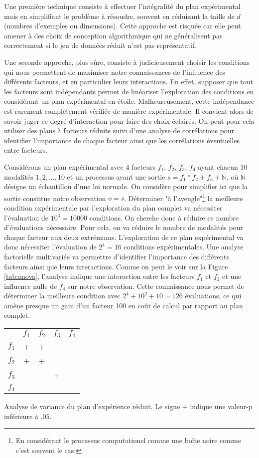 Une première technique consiste à effectuer l'intégralité du plan expérimental mais en simplifiant le problème à résoudre, souvent en réduisant la taille de $d$ (nombres d'exemples ou dimensions). Cette approche est risquée car elle peut amener à des choix de conception algorithmique qui ne généralisent pas correctement si le jeu de données réduit n'est pas représentatif.

Une seconde approche, plus sûre, consiste à judicieusement choisir les conditions qui nous permettent de maximiser notre connaissances de l'influence des différents facteurs, et en particulier leurs interactions. En effet, supposer que tout les facteurs sont indépendants permet de linéariser l'exploration des conditions en considérant un plan expérimental en étoile. Malheureusement, cette indépendance est rarement complètement vérifiée de manière expérimentale. Il convient alors de savoir juger ce degré d'interaction pour faire des choix éclairés. On peut pour cela utiliser des plans à facteurs réduits suivi d'une analyse de corrélations pour identifier l'importance de chaque facteur ainsi que les corrélations éventuelles entre facteurs.

Considérons un plan expérimental avec 4 facteurs $f_1$, $f_2$, $f_3$, $f_4$ ayant chacun 10 modalités ${1, 2, ..., 10}$ et un processus ayant une sortie $s=f_1*f_2+f_3+\mathbb{N}$, où $\mathbb{N}$ désigne un échantillon d'une loi normale. On considère pour simplifier ici que la sortie constitue notre observation $o=s$. Déterminer "à l'aveugle"\footnote{En considérant le processus computationel comme une boîte noire comme c'est souvent le cas.} la meilleure condition expérimentale par l'exploration du plan complet va nécessiter l'évaluation de $10^4=10000$ conditions. On cherche donc à réduire ce nombre d'évaluations nécessaire. Pour cela, on va réduire le nombre de modalités pour chaque facteur aux deux extrémums. L'exploration de ce plan expérimental va donc nécessiter l'évaluation de $2^4 = 16$ conditions expérimentales. Une analyse factorielle multivariée va permettre d'identifier l'importance des différents facteurs ainsi que leurs interactions. Comme on peut le voir sur la Figure \ref{tab:anova}, l'analyse indique une interaction entre les facteurs $f_1$ et $f_2$ et une influence nulle de $f_4$ sur notre observation. Cette connaissance nous permet de déterminer la meilleure condition avec $2^4+10^2+10=126$ évaluations, ce qui amène presque un gain d'un facteur 100 en coût de calcul par rapport au plan complet.

\begin{margintable}
\begin{tabular}{ccccc}
  & $f_1$ & $f_2$ & $f_3$ & $f_4$ \\
$f_1$  &  + & + & & \\
$f_2$  & + & + & & \\
$f_3$  & & & + & \\
$f_4$  & & & & \\
\end{tabular}
\caption{Analyse de variance du plan d'expérience réduit. Le signe $+$ indique une valeur-p inférieure à $.05$.}
\label{tab:anova}
\end{margintable}

